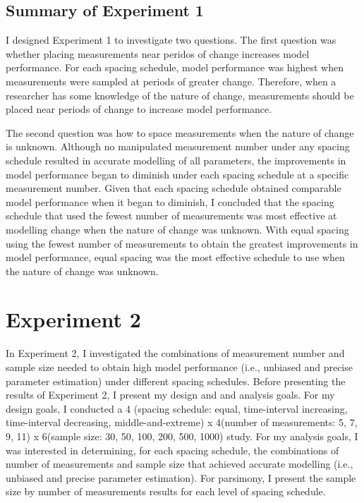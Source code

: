 \documentclass[
12pt, %
twoside,
english]{guelphthesis}
\begin{document}
\hypertarget{summary-of-experiment-1}{%
\section{Summary of Experiment 1}\label{summary-of-experiment-1}}

I designed Experiment 1 to investigate two questions. The first question was whether placing measurements near peridos of change increases model performance. For each spacing schedule, model performance was highest when measurements were sampled at periods of greater change. Therefore, when a researcher has some knowledge of the nature of change, measurements should be placed near periods of change to increase model performance.

The second question was how to space measurements when the nature of change is unknown. Although no manipulated measurement number under any spacing schedule resulted in accurate modelling of all parameters, the improvements in model performance began to diminish under each spacing schedule at a specific measurement number. Given that each spacing schedule obtained comparable model performance when it began to diminish, I concluded that the spacing schedule that used the fewest number of measurements was most effective at modelling change when the nature of change was unknown. With equal spacing using the fewest number of measurements to obtain the greatest improvements in model performance, equal spacing was the most effective schedule to use when the nature of change was unknown.

\hypertarget{Exp2}{%
\chapter{Experiment 2}\label{Exp2}}

In Experiment 2, I investigated the combinations of measurement number and sample size needed to obtain high model performance (i.e., unbiased and precise parameter estimation) under different spacing schedules. Before presenting the results of Experiment 2, I present my design and and analysis goals. For my design goals, I conducted a 4 (spacing schedule: equal, time-interval increasing, time-interval decreasing, middle-and-extreme) x 4(number of measurements: 5, 7, 9, 11) x 6(sample size: 30, 50, 100, 200, 500, 1000) study. For my analysis goals, I was interested in determining, for each spacing schedule, the combinations of number of measurements and sample size that achieved accurate modelling (i.e., unbiased and precise parameter estimation). For parsimony, I present the sample size by number of measurements results for each level of spacing schedule.
\end{document}
